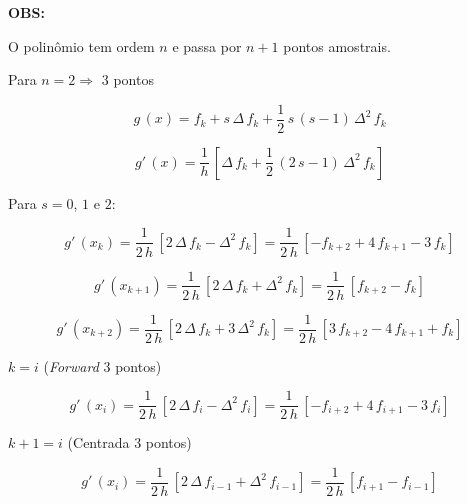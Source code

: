 \begin{enumerar}
\textbf{OBS:}

O polinômio  tem ordem $n$ e passa por $n+1$ pontos amostrais.

\item Para $n = 2 \Rightarrow$ 3 pontos

\begin{equation}
 \label{cap3:sec3:eq5}
 g\,(x) = f_k + s\,\Delta\,f_k + \frac{1}{2}\,s\,(s-1)\,\Delta^2\,f_k
\end{equation}

\begin{equation}
 \label{cap3:sec3:eq6}
 g'\,(x) = \frac{1}{h} \, \left[ \Delta\,f_k + \frac{1}{2}\,(2\,s-1)\,\Delta^2\,f_k \right]
\end{equation}

Para $s = 0$, $1$ e $2$:

\begin{equation}
 \label{cap3:sec3:eq7}
 g'\,(x_k) = \frac{1}{2\,h} \, \left[ 2\,\Delta\,f_k - \Delta^2\,f_k \right] = \frac{1}{2\,h} \, \left[ -f_{k+2} + 4\,f_{k+1} - 3\,f_k \right]
\end{equation}

\begin{equation}
 \label{cap3:sec3:eq8}
 g'\,(x_{k+1}) = \frac{1}{2\,h} \, \left[ 2\,\Delta\,f_k + \Delta^2\,f_k \right] = \frac{1}{2\,h} \, \left[ f_{k+2} - f_k \right]
\end{equation}

\begin{equation}
 \label{cap3:sec3:eq9}
 g'\,(x_{k+2}) = \frac{1}{2\,h} \, \left[ 2\,\Delta\,f_k + 3\,\Delta^2\,f_k \right] = \frac{1}{2\,h} \, \left[ 3\,f_{k+2} - 4\,f_{k+1} + f_k \right]
\end{equation}

$k = i$ (\textit{Forward} 3 pontos)

\begin{equation}
 \label{cap3:sec3:eq10}
 g'\,(x_i) = \frac{1}{2\,h} \, \left[ 2\,\Delta\,f_i - \Delta^2\,f_i \right] = \frac{1}{2\,h} \, \left[ -f_{i+2} + 4\,f_{i+1} - 3\,f_i \right]
\end{equation}

$k + 1 = i$ (Centrada 3 pontos)

\begin{equation}
 \label{cap3:sec3:eq11}
 g'\,(x_i) = \frac{1}{2\,h} \, \left[ 2\,\Delta\,f_{i-1} + \Delta^2\,f_{i-1} \right] = \frac{1}{2\,h} \, \left[ f_{i+1} - f_{i-1} \right]
\end{equation}


\end{enumerar}
